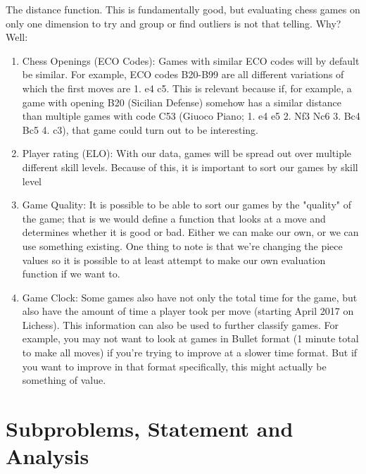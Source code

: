 \documentclass[12pt]{article}
\begin{document}
        The distance function. This is fundamentally good, but evaluating chess games on only one dimension to try and group or find outliers is not that telling. Why? Well:

        \begin{enumerate}
            \item Chess Openings (ECO Codes): Games with similar ECO codes will by default be similar. For example, ECO codes B20-B99 are all different variations of which the first moves are 1. e4 c5. This is relevant because if, for example, a game with opening B20 (Sicilian Defense) somehow has a similar distance than multiple games with code C53 (Giuoco Piano; 1. e4 e5 2. Nf3 Nc6 3. Bc4 Bc5 4. c3), that game could turn out to be interesting. 
            \item Player rating (ELO): With our data, games will be spread out over multiple different skill levels. Because of this, it is important to sort our games by skill level 
            \item Game Quality: It is possible to be able to sort our games by the "quality" of the game; that is we would define a function that looks at a move and determines whether it is good or bad. Either we can make our own, or we can use something existing. One thing to note is that we're changing the piece values so it is possible to at least attempt to make our own evaluation function if we want to.
            \item Game Clock: Some games also have not only the total time for the game, but also have the amount of time a player took per move (starting April 2017 on Lichess). This information can also be used to further classify games. For example, you may not want to look at games in Bullet format (1 minute total to make all moves) if you're trying to improve at a slower time format. But if you want to improve in that format specifically, this might actually be something of value.
        \end{enumerate}

    \section{Subproblems, Statement and Analysis}
\end{document}
